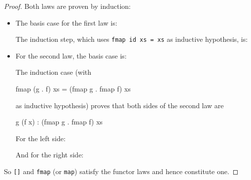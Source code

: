 \begin{example}[\texttt{[]}]
  \begin{proof}
    Both laws are proven by induction:
    \begin{itemize}
    \item
      The basis case for the first law is:
      \begin{steps}
        \steph{[]}
      \end{steps}
      The induction step, which uses \texttt{fmap id xs = xs} as
      inductive hypothesis, is:
      \begin{steps}
          \eqbyihh
      \end{steps}
    \item
      For the second law, the basis case is:
      \begin{steps}
        \steph{[]}
      \end{steps}
      The induction case (with
      \begin{codehaskell}
        fmap (g . f) xs = (fmap g . fmap f) xs
      \end{codehaskell}
      as inductive hypothesis) proves that both sides of
      the second law are
      \begin{codehaskell}
        g (f x) : (fmap g . fmap f) xs
      \end{codehaskell}
      For the left side:
      \begin{steps}
          \eqbyihh
      \end{steps}
      And for the right side:
      \begin{steps}
      \end{steps}
    \end{itemize}
    So \texttt{[]} and \texttt{fmap} (or \texttt{map}) satisfy the
    functor laws and hence constitute one.
  \end{proof}
\end{example}

